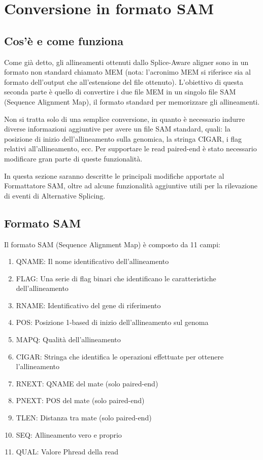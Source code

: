 \section{Conversione in formato SAM}

\subsection{Cos'è e come funziona}
Come già detto, gli allineamenti ottenuti dallo Splice-Aware aligner sono in un formato non standard chiamato MEM (nota: l'acronimo MEM si riferisce sia al formato dell'output che all'estensione del file ottenuto). L'obiettivo di questa seconda parte è quello di convertire i due file MEM in un singolo file SAM (Sequence Alignment Map), il formato standard per memorizzare gli allineamenti.

Non si tratta solo di una semplice conversione, in quanto è necessario indurre diverse informazioni aggiuntive per avere un file SAM standard, quali: la posizione di inizio dell'allineamento sulla genomica, la stringa CIGAR, i flag relativi all'allineamento, ecc. Per supportare le read paired-end è stato necessario modificare gran parte di queste funzionalità.

In questa sezione saranno descritte le principali modifiche apportate al Formattatore SAM, oltre ad alcune funzionalità aggiuntive utili per la rilevazione di eventi di Alternative Splicing.

\newpage

\subsection{Formato SAM}
Il formato SAM (Sequence Alignment Map) è composto da 11 campi:

\begin{enumerate}
	\item QNAME: Il nome identificativo dell'allineamento
	\item FLAG: Una serie di flag binari che identificano le caratteristiche dell'allineamento
	\item RNAME: Identificativo del gene di riferimento
	\item POS: Posizione 1-based di inizio dell'allineamento sul genoma
	\item MAPQ:  Qualità dell'allineamento
	\item CIGAR: Stringa che identifica le operazioni effettuate per ottenere l'allineamento
	\item RNEXT: QNAME del mate (solo paired-end)
	\item PNEXT: POS del mate	(solo paired-end)
	\item TLEN:  Distanza tra mate (solo paired-end)
	\item SEQ:  	Allineamento vero e proprio
	\item QUAL: Valore Phread della read
\end{enumerate}

